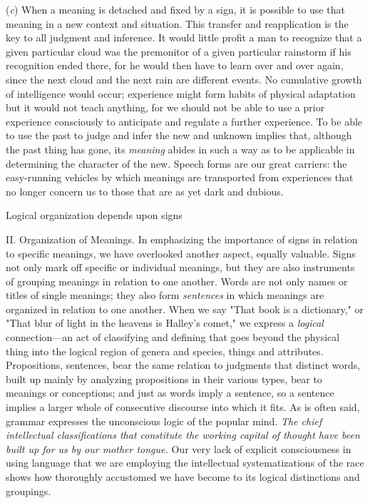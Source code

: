 \documentclass[letterpaper]{book}
\begin{document}
(\emph{c}) When a meaning is detached and fixed by a sign, it is
possible to use that meaning in a new context and situation. This
transfer and reapplication is the key to all judgment and inference. It
would little profit a man to recognize that a given particular cloud was
the premonitor of a given particular rainstorm if his recognition ended
there, for he would then have to learn over and over again, since the
next cloud and the next rain are different events. No cumulative growth
of intelligence would occur; experience might form habits of physical
adaptation but it would not teach anything, for we should not be able to
use a prior experience consciously to anticipate and regulate a further
experience. To be able to
use
the past to judge and infer the new and unknown implies that, although
the past thing has gone, its \emph{meaning} abides in such a way as to
be applicable in determining the character of the new. Speech forms are
our great carriers: the easy-running vehicles by which meanings are
transported from experiences that no longer concern us to those that are
as yet dark and dubious.

Logical organization depends upon signs

II. Organization of Meanings. In emphasizing the importance of signs in
relation to specific meanings, we have overlooked another aspect,
equally valuable. Signs not only mark off specific or individual
meanings, but they are also instruments of grouping meanings in relation
to one another. Words are not only names or titles of single meanings;
they also form \emph{sentences} in which meanings are organized in
relation to one another. When we say "That book is a dictionary," or
"That blur of light in the heavens is Halley's comet," we express a
\emph{logical} connection---an act of classifying and defining that goes
beyond the physical thing into the logical region of genera and species,
things and attributes. Propositions, sentences, bear the same relation
to judgments that distinct words, built up mainly by analyzing
propositions in their various types, bear to meanings or conceptions;
and just as words imply a sentence, so a sentence implies a larger whole
of consecutive discourse into which it fits. As is often said, grammar
expresses the unconscious logic of the popular mind. \emph{The chief
intellectual classifications that constitute the working capital of
thought have been built up for us by our mother tongue.} Our very lack
of explicit consciousness in using language that we are employing the
intellectual systematizations of the race shows how thoroughly
accustomed we have become to its logical distinctions and
groupings.
\end{document}

